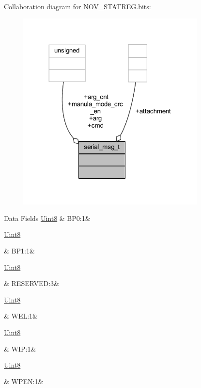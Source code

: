 Collaboration diagram for N\+O\+V\+\_\+\+S\+T\+A\+T\+R\+E\+G.\+bits\+:\nopagebreak
\begin{figure}[H]
\begin{center}
\leavevmode
\includegraphics[width=269pt]{d6/d53/a01688}
\end{center}
\end{figure}
\begin{DoxyFields}{Data Fields}
\hypertarget{a00029_a3121d0887e99468394023243c3a0bc90}{\hyperlink{a00072_af84840501dec18061d18a68c162a8fa2}{Uint8}}\label{a00029_a3121d0887e99468394023243c3a0bc90}
&
B\+P0\+:1&
\\
\hline

\hypertarget{a00029_af8df2b17a776cdf338edbd01114edc2c}{\hyperlink{a00072_af84840501dec18061d18a68c162a8fa2}{Uint8}}\label{a00029_af8df2b17a776cdf338edbd01114edc2c}
&
B\+P1\+:1&
\\
\hline

\hypertarget{a00029_a83c7f2aa8c3ac10ed8beb75cad162827}{\hyperlink{a00072_af84840501dec18061d18a68c162a8fa2}{Uint8}}\label{a00029_a83c7f2aa8c3ac10ed8beb75cad162827}
&
R\+E\+S\+E\+R\+V\+E\+D\+:3&
\\
\hline

\hypertarget{a00029_afd1debe9f2730b7ea828ce8ec10ff345}{\hyperlink{a00072_af84840501dec18061d18a68c162a8fa2}{Uint8}}\label{a00029_afd1debe9f2730b7ea828ce8ec10ff345}
&
W\+E\+L\+:1&
\\
\hline

\hypertarget{a00029_a60f2bfeaed0a36ff9864e008e1e67a36}{\hyperlink{a00072_af84840501dec18061d18a68c162a8fa2}{Uint8}}\label{a00029_a60f2bfeaed0a36ff9864e008e1e67a36}
&
W\+I\+P\+:1&
\\
\hline

\hypertarget{a00029_aa5b1cca69b0535f7624ddff3e882fc74}{\hyperlink{a00072_af84840501dec18061d18a68c162a8fa2}{Uint8}}\label{a00029_aa5b1cca69b0535f7624ddff3e882fc74}
&
W\+P\+E\+N\+:1&
\\
\hline

\end{DoxyFields}


